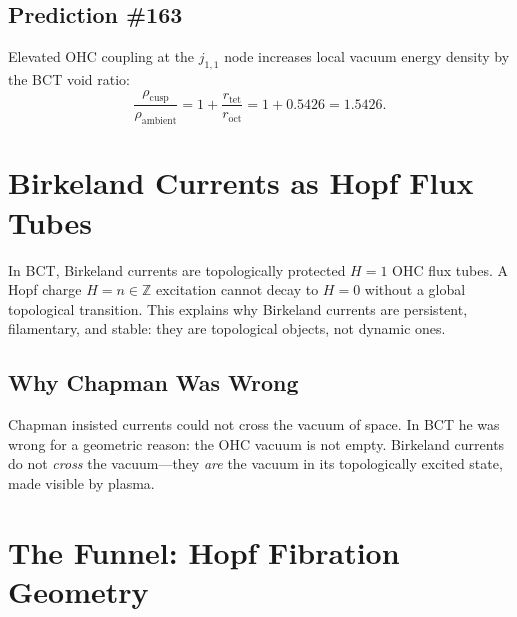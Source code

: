 \documentclass[aps,prl,twocolumn,superscriptaddress,floatfix]{revtex4-2}
\begin{document}
\subsection{Prediction \#163}

Elevated OHC coupling at the $j_{1,1}$ node increases local vacuum
energy density by the BCT void ratio:
\begin{equation}
\frac{\rho_\mathrm{cusp}}{\rho_\mathrm{ambient}}
= 1 + \frac{r_\mathrm{tet}}{r_\mathrm{oct}}
= 1 + 0.5426 = \boxed{1.5426}.
\label{eq:pred163}
\end{equation}

\noindent{}

\section{Birkeland Currents as Hopf Flux Tubes}

In BCT, Birkeland currents are topologically protected $H=1$ OHC
flux tubes. A Hopf charge $H=n\in\mathbb{Z}$ excitation cannot decay
to $H=0$ without a global topological transition. This explains why
Birkeland currents are persistent, filamentary, and stable: they are
topological objects, not dynamic ones.

\subsection{Why Chapman Was Wrong}

Chapman insisted currents could not cross the vacuum of space. In BCT
he was wrong for a geometric reason: the OHC vacuum is not empty.
Birkeland currents do not \emph{cross} the vacuum---they \emph{are}
the vacuum in its topologically excited state, made visible by plasma.

\section{The Funnel: Hopf Fibration Geometry}
\end{document}
